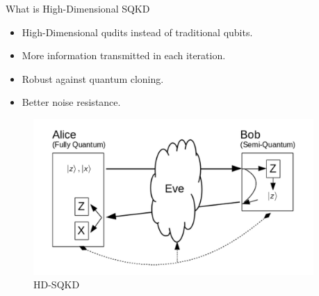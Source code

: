 \documentclass[final]{beamer}
\newlength{\onecolwid}
\newlength{\twocolwid}
\begin{document}
\begin{frame}[t]
\begin{columns}[t]
\begin{column}{\twocolwid}
\begin{columns}[t,totalwidth=\twocolwid]
\begin{column}{\onecolwid}

\begin{block}{What is High-Dimensional SQKD}

\begin{itemize}
\item High-Dimensional qudits instead of traditional qubits. 
\item More information transmitted in each iteration. 
\item Robust against quantum cloning.
\item Better noise resistance. 
\end{itemize}

\begin{figure}
	\includegraphics[width=\linewidth]{sqkd_hidim}
	\caption{HD-SQKD}
	\label{fig:sqkd_hidim}
\end{figure}


\end{block}


\end{column} %

\begin{column}{\onecolwid}\vspace{-.6in} %



\end{column}
\end{columns}
\end{column}
\end{columns}
\end{frame}
\end{document}
